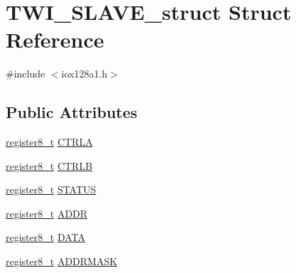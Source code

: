 \hypertarget{struct_t_w_i___s_l_a_v_e__struct}{
\section{TWI\_\-SLAVE\_\-struct Struct Reference}
\label{struct_t_w_i___s_l_a_v_e__struct}
}


{\ttfamily \#include $<$iox128a1.h$>$}

\subsection*{Public Attributes}
\begin{DoxyCompactItemize}
\item 
\hyperlink{iox128a1_8h_a6a0649252b392263406882923b04a9db}{register8\_\-t} \hyperlink{struct_t_w_i___s_l_a_v_e__struct_a368e61b5070765979e1d5d8a00687a92}{CTRLA}
\item 
\hyperlink{iox128a1_8h_a6a0649252b392263406882923b04a9db}{register8\_\-t} \hyperlink{struct_t_w_i___s_l_a_v_e__struct_a42b52363308067436689b8f9d9de05e3}{CTRLB}
\item 
\hyperlink{iox128a1_8h_a6a0649252b392263406882923b04a9db}{register8\_\-t} \hyperlink{struct_t_w_i___s_l_a_v_e__struct_a040378c3344b5d83ca9b17edcc208fe5}{STATUS}
\item 
\hyperlink{iox128a1_8h_a6a0649252b392263406882923b04a9db}{register8\_\-t} \hyperlink{struct_t_w_i___s_l_a_v_e__struct_ab9fb9ebe8412ecb0543868c5b91e23e1}{ADDR}
\item 
\hyperlink{iox128a1_8h_a6a0649252b392263406882923b04a9db}{register8\_\-t} \hyperlink{struct_t_w_i___s_l_a_v_e__struct_a7a233a95d65c4d866e893aed944853a9}{DATA}
\item 
\hyperlink{iox128a1_8h_a6a0649252b392263406882923b04a9db}{register8\_\-t} \hyperlink{struct_t_w_i___s_l_a_v_e__struct_a2bd9702983b73ea43d8477480f23d01e}{ADDRMASK}
\end{DoxyCompactItemize}


